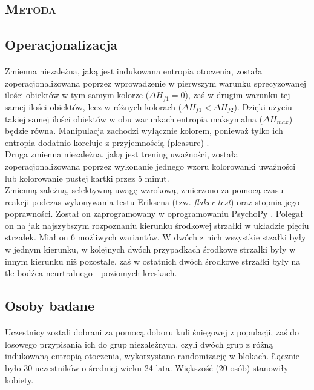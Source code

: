 \documentclass[12pt,a4paper,final,oneside,onecolumn,titlepage]{article}
\begin{document}
\begin{center}
\section*{\large{\textbf{\textsc{Metoda}}}}
\end{center}
\subsection*{\normalsize{\textbf{Operacjonalizacja}}}
\paragraph{}
Zmienna niezależna, jaką jest indukowana entropia otoczenia, została zoperacjonalizowana poprzez wprowadzenie w pierwszym warunku sprecyzowanej ilości obiektów w tym samym kolorze ($\Delta H_{f1}=0$), zaś w drugim warunku tej samej ilości obiektów, lecz w różnych kolorach ($\Delta H_{f1}<\Delta H_{f2}$). Dzięki użyciu takiej samej ilości obiektów w obu warunkach entropia maksymalna ($\Delta H_{max}$) będzie równa. Manipulacja zachodzi wyłącznie kolorem, ponieważ tylko ich entropia dodatnio koreluje z przyjemnością (pleasure) \citep{stamps_entropy_2004, stamps_entropy_2002}.\\
Druga zmienna niezależna, jaką jest trening uważności, została zoperacjonalizowana poprzez wykonanie jednego wzoru kolorowanki uważności lub kolorowanie pustej kartki przez 5 minut.\\
Zmienną zależną, selektywną uwagę wzrokową, zmierzono za pomocą czasu reakcji podczas wykonywania testu Eriksena (tzw. \textit{flaker test}) oraz stopnia jego poprawności. Został on zaprogramowany w oprogramowaniu PsychoPy \citep{peirce_psychopy2_2019}. Polegał on na jak najszybszym rozpoznaniu kierunku środkowej strzałki w układzie pięciu strzałek. Miał on 6 możliwych wariantów. W dwóch z nich wszystkie stzałki były w jednym kierunku, w kolejnych dwóch przypadkach środkowe strzałki były w innym kierunku niż pozostałe, zaś w ostatnich dwóch środkowe strzałki były na tle bodźca neurtralnego - poziomych kreskach.
\subsection*{\normalsize{\textbf{Osoby badane}}}
\paragraph{}
Uczestnicy zostali dobrani za pomocą doboru kuli śniegowej z populacji, zaś do losowego przypisania ich do grup niezależnych, czyli dwóch grup z różną indukowaną entropią otoczenia, wykorzystano randomizację w blokach. Łącznie było 30 uczestników o średniej wieku 24 lata. Większość (20 osób) stanowiły kobiety.
\end{document}
